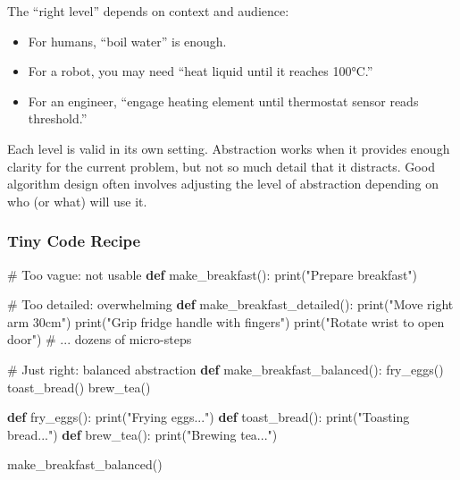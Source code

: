 \documentclass[
  letterpaper,
  DIV=11,
  numbers=noendperiod]{scrreprt}
\newenvironment{Shaded}{\begin{snugshade}}{\end{snugshade}}
\newcommand{\BuiltInTok}[1]{\textcolor[rgb]{0.00,0.23,0.31}{#1}}
\newcommand{\CommentTok}[1]{\textcolor[rgb]{0.37,0.37,0.37}{#1}}
\newcommand{\KeywordTok}[1]{\textcolor[rgb]{0.00,0.23,0.31}{\textbf{#1}}}
\newcommand{\NormalTok}[1]{\textcolor[rgb]{0.00,0.23,0.31}{#1}}
\newcommand{\StringTok}[1]{\textcolor[rgb]{0.13,0.47,0.30}{#1}}
\providecommand{\tightlist}{%
  \setlength{\itemsep}{0pt}\setlength{\parskip}{0pt}}
\begin{document}
The ``right level'' depends on context and audience:

\begin{itemize}
\tightlist
\item
  For humans, ``boil water'' is enough.
\item
  For a robot, you may need ``heat liquid until it reaches 100°C.''
\item
  For an engineer, ``engage heating element until thermostat sensor
  reads threshold.''
\end{itemize}

Each level is valid in its own setting. Abstraction works when it
provides enough clarity for the current problem, but not so much detail
that it distracts. Good algorithm design often involves adjusting the
level of abstraction depending on who (or what) will use it.

\subsubsection{Tiny Code Recipe}\label{tiny-code-recipe-43}

\begin{Shaded}
\begin{Highlighting}[]
\CommentTok{\# Too vague: not usable}
\KeywordTok{def}\NormalTok{ make\_breakfast():}
    \BuiltInTok{print}\NormalTok{(}\StringTok{"Prepare breakfast"}\NormalTok{)}

\CommentTok{\# Too detailed: overwhelming}
\KeywordTok{def}\NormalTok{ make\_breakfast\_detailed():}
    \BuiltInTok{print}\NormalTok{(}\StringTok{"Move right arm 30cm"}\NormalTok{)}
    \BuiltInTok{print}\NormalTok{(}\StringTok{"Grip fridge handle with fingers"}\NormalTok{)}
    \BuiltInTok{print}\NormalTok{(}\StringTok{"Rotate wrist to open door"}\NormalTok{)}
    \CommentTok{\# ... dozens of micro{-}steps}

\CommentTok{\# Just right: balanced abstraction}
\KeywordTok{def}\NormalTok{ make\_breakfast\_balanced():}
\NormalTok{    fry\_eggs()}
\NormalTok{    toast\_bread()}
\NormalTok{    brew\_tea()}

\KeywordTok{def}\NormalTok{ fry\_eggs(): }\BuiltInTok{print}\NormalTok{(}\StringTok{"Frying eggs..."}\NormalTok{)}
\KeywordTok{def}\NormalTok{ toast\_bread(): }\BuiltInTok{print}\NormalTok{(}\StringTok{"Toasting bread..."}\NormalTok{)}
\KeywordTok{def}\NormalTok{ brew\_tea(): }\BuiltInTok{print}\NormalTok{(}\StringTok{"Brewing tea..."}\NormalTok{)}

\NormalTok{make\_breakfast\_balanced()}
\end{Highlighting}
\end{Shaded}
\end{document}
